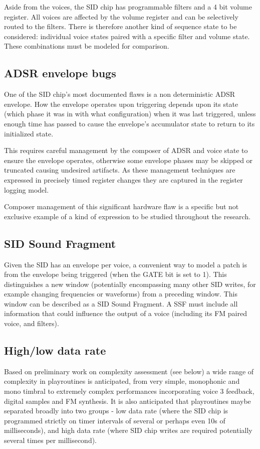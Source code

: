 \documentclass[10pt]{article}
\begin{document}
\begin{multicols*}{2}
Aside from the voices, the SID chip has programmable filters and a 4 bit volume register. All voices are affected by the volume register and can be selectively routed to the filters. There is therefore another kind of sequence state to be considered: individual voice states paired with a specific filter and volume state. These combinations must be modeled for comparison.

\subsection{ADSR envelope bugs}

One of the SID chip’s most documented flaws is a non deterministic ADSR envelope. How the envelope operates upon triggering depends upon its state (which phase it was in with what configuration) when it was last triggered, unless enough time has passed to cause the envelope’s accumulator state to return to its initialized state.

This requires careful management by the composer of ADSR and voice state to ensure the envelope operates, otherwise some envelope phases may be skipped or truncated causing undesired artifacts. As these management techniques are expressed in precisely timed register changes they are captured in the register logging model.

Composer management of this significant hardware flaw is a specific but not exclusive example of a kind of expression to be studied throughout the research.

\subsection{SID Sound Fragment}

Given the SID has an envelope per voice, a convenient way to model a patch is from the envelope being triggered (when the GATE bit is set to 1). This distinguishes a new window (potentially encompassing many other SID writes, for example changing frequencies or waveforms) from a preceding window. This window can be described as a SID Sound Fragment. A SSF must include all information that could influence the output of a voice (including its FM paired voice, and filters).

\subsection{High/low data rate}

Based on preliminary work on complexity assessment (see below) a wide range of complexity in playroutines is anticipated, from very simple, monophonic and mono timbral to extremely complex performances incorporating voice 3 feedback, digital samples and FM synthesis. It is also anticipated that playroutines maybe separated broadly into two groups - low data rate (where the SID chip is programmed strictly on timer intervals of several or perhaps even 10s of milliseconds), and high data rate (where SID chip writes are required potentially several times per millisecond).


\end{multicols*}
\end{document}
